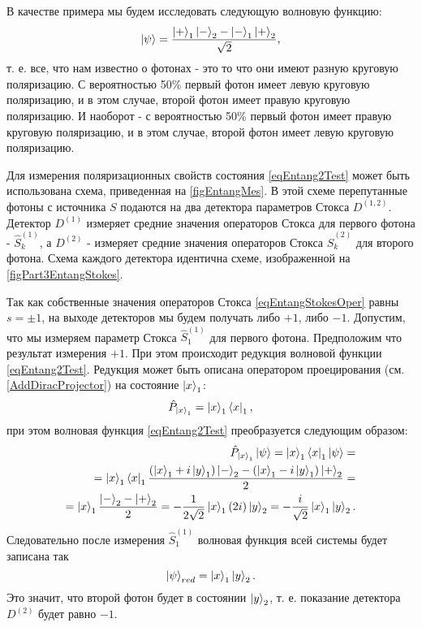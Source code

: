 В качестве примера мы будем исследовать следующую волновую функцию:
\begin{equation}
  \ket{\psi} = \frac{
    \ket{ + }_1\ket{ - }_2 -
    \ket{ - }_1\ket{ + }_2
  }{\sqrt{2}},
\label{eqEntang2Test}
\end{equation}
т. е. все, что нам известно о фотонах - это то что они имеют разную
круговую поляризацию. С вероятностью 50\% первый фотон имеет левую
круговую поляризацию, и в этом случае, второй фотон имеет правую
круговую поляризацию. И наоборот -  с вероятностью 50\% первый фотон
имеет правую круговую поляризацию, и в этом случае, второй фотон имеет
левую круговую поляризацию. 



Для измерения поляризационных свойств состояния \eqref{eqEntang2Test}
может быть использована схема, приведенная на \autoref{figEntangMes}. 
В этой схеме перепутанные фотоны с источника $S$ подаются на два детектора
параметров Стокса $D^{(1,2)}$. Детектор $D^{(1)}$ измеряет средние
значения операторов Стокса для первого фотона - $\hat{S}_k^{(1)}$, а
$D^{(2)}$ - измеряет средние значения операторов Стокса
$\hat{S}_k^{(2)}$ для второго фотона. Схема каждого детектора
идентична схеме, изображенной на \autoref{figPart3EntangStokes}.

Так как собственные значения операторов Стокса
\eqref{eqEntangStokesOper} равны $s = \pm 1$, на выходе детекторов мы
будем получать либо $+1$, либо $-1$. Допустим, что мы измеряем параметр
Стокса $\hat{S}_1^{(1)}$ для первого фотона. Предположим что
результат измерения $+1$. При этом происходит редукция волновой функции
\eqref{eqEntang2Test}. Редукция может быть описана оператором
проецирования (см. \autoref{AddDiracProjector}) на состояние
$\ket{x}_1$:
\[
\hat{P}_{\ket{x}_1} = \ket{x}_1\bra{x}_1,
\]
при этом волновая функция
\eqref{eqEntang2Test} преобразуется следующим образом:
\begin{eqnarray}
  \hat{P}_{\ket{x}_1}\left|\psi\right> =
  \ket{x}_1\bra{x}_1 \left|\psi\right> =
  \nonumber \\
    =
  \ket{x}_1\bra{x}_1
  \frac{
    \left( \ket{x}_1 + i \ket{y}_1 \right)\ket{ - }_2 -
    \left( \ket{x}_1 - i \ket{y}_1 \right)\ket{ + }_2
  }{2} =
  \nonumber \\
  =
  \ket{x}_1
  \frac{\ket{ - }_2 - \ket{ + }_2}{2} = -
  \frac{1}{2\sqrt{2}}\ket{x}_1 \left(2 i\right)
  \ket{y}_2 = -
  \frac{i}{\sqrt{2}}\ket{x}_1\ket{y}_2.
\nonumber
\end{eqnarray}
Следовательно после измерения $\hat{S}_1^{(1)}$ волновая функция всей
системы будет записана так
\[
\left|\psi\right>_{red} = \ket{x}_1\ket{y}_2.
\]
Это значит, что второй фотон будет в состоянии $\ket{y}_2$,
т. е.  показание детектора $D^{(2)}$ будет равно $-1$.

